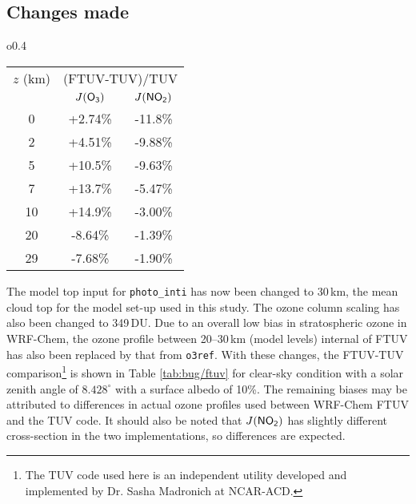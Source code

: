 \subsection{Changes made}\label{a-ssec:bug/ftuv/fix}
	\begin{wraptable}{o}{0.4\textwidth}
	\vspace{-.5in}
		\begin{singlespacing}
		\caption{Compaison of photolysis rates from FTUV and TUV.}
		\begin{center}
		\begin{tabular}{c|cc} \hline
		$z$ (\unit{km}) & \multicolumn{2}{c}{(FTUV-TUV)/TUV} \\ 
		 & \hspace{.15in}$J(\chem{O_3})$\hspace{.15in} & \hspace{.15in}$J(\chem{NO_2})$\hspace{.15in}  \\ \hline\hline
		0	& +2.74\% & -11.8\% \\
		2	& +4.51\% & -9.88\% \\
		5	& +10.5\% & -9.63\% \\
		7	& +13.7\% & -5.47\% \\
		10	& +14.9\% & -3.00\% \\
		20	& -8.64\% & -1.39\% \\
		29	& -7.68\% & -1.90\% \\ \hline
		\end{tabular}
		\label{tab:bug/ftuv}
		\end{center}
		\end{singlespacing}
	\vspace{-.1in}
	\end{wraptable}

	The model top input for \texttt{photo\_inti} has now been changed to 30\,\unit{km}, the mean cloud top for the model set-up used in this study. The ozone column scaling has also been changed to 349\,\unit{DU}. Due to an overall low bias in stratospheric ozone in WRF-Chem, the ozone profile between 20--30\,\unit{km} (model levels) internal of FTUV has also been replaced by that from \texttt{o3ref}. With these changes, the FTUV-TUV comparison\footnote{The TUV code used here is an independent utility developed and implemented by Dr. Sasha Madronich at NCAR-ACD.} is shown in Table \ref{tab:bug/ftuv} for clear-sky condition with a solar zenith angle of $8.428^\circ$ with a surface albedo of 10\%. The remaining biases may be attributed to differences in actual ozone profiles used between WRF-Chem FTUV and the TUV code. It should also be noted that $J(\chem{NO_2})$ has slightly different cross-section in the two implementations, so differences are expected.

